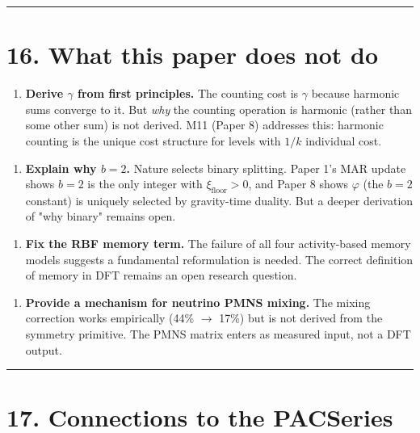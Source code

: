 \documentclass[11pt,a4paper]{article}
\providecommand{\tightlist}{\setlength{\itemsep}{0pt}\setlength{\parskip}{0pt}}
\begin{document}
\begin{center}\rule{0.5\linewidth}{0.4pt}\end{center}

\section*{16. What this paper does not do}

\begin{enumerate}\tightlist
\item \textbf{Derive $\gamma$ from first principles.} The counting cost is $\gamma$ because harmonic sums converge to it. But \emph{why} the counting operation is harmonic (rather than some other sum) is not derived. M11 (Paper 8) addresses this: harmonic counting is the unique cost structure for levels with $1/k$ individual cost.
\end{enumerate}

\begin{enumerate}\tightlist
\item \textbf{Explain why $b = 2$.} Nature selects binary splitting. Paper 1's MAR update shows $b = 2$ is the only integer with $\xi_{\text{floor}} > 0$, and Paper 8 shows $\varphi$ (the $b = 2$ constant) is uniquely selected by gravity-time duality. But a deeper derivation of "why binary" remains open.
\end{enumerate}

\begin{enumerate}\tightlist
\item \textbf{Fix the RBF memory term.} The failure of all four activity-based memory models suggests a fundamental reformulation is needed. The correct definition of memory in DFT remains an open research question.
\end{enumerate}

\begin{enumerate}\tightlist
\item \textbf{Provide a mechanism for neutrino PMNS mixing.} The mixing correction works empirically (44\% $\to$ 17\%) but is not derived from the symmetry primitive. The PMNS matrix enters as measured input, not a DFT output.
\end{enumerate}

\begin{center}\rule{0.5\linewidth}{0.4pt}\end{center}

\section*{17. Connections to the PACSeries}
\end{document}
